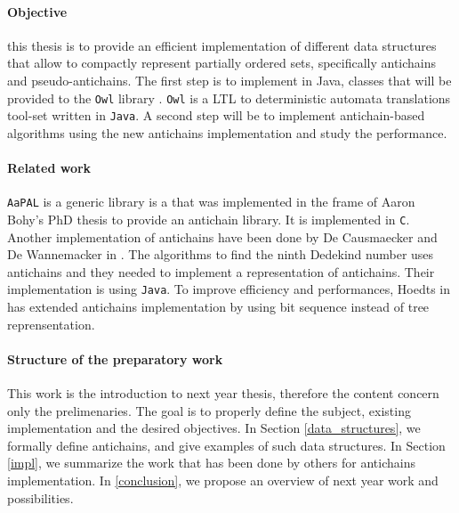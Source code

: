 \documentclass[letterpaper]{article}
\theoremstyle{definition}
\begin{document}
\paragraph{Objective}


this thesis is to provide an efficient implementation of different
data structures that allow to compactly
represent partially ordered sets, specifically antichains and
pseudo-antichains.
The first step is to implement in Java, classes that will be provided to
the \texttt{Owl} library \cite{owl}.
\texttt{Owl} is a LTL to deterministic automata translations tool-set written
in \texttt{Java}. A second step will be to implement
antichain-based algorithms using the new antichains implementation and
study the performance.

\paragraph{Related work}


\texttt{AaPAL} is a generic
library is a that was implemented in the frame of
Aaron Bohy's PhD thesis \cite{bohy_phd}
to provide an antichain library. It is implemented in \texttt{C}.
Another implementation of antichains
have been done
by De Causmaecker and De Wannemacker in \cite{causemaecker1}. The algorithms
to find the ninth Dedekind number uses antichains and they needed to
implement a representation of antichains. Their implementation is using
\texttt{Java}.
To improve efficiency and performances, Hoedts in \cite{hoedt} has extended
\cite{causemaecker1} antichains implementation by using bit sequence
instead of tree reprensentation.


\paragraph{Structure of the preparatory work}

This work is the introduction to next year thesis, therefore
the content concern only the prelimenaries. The goal is to
properly define the subject, existing implementation and the desired objectives.
In Section \ref{data_structures}, we formally define antichains,
and give examples of such data structures. In Section \ref{impl},
we summarize the work that has been done by others
for antichains implementation. In \ref{conclusion}, we propose
an overview of next year work and possibilities.
\end{document}
